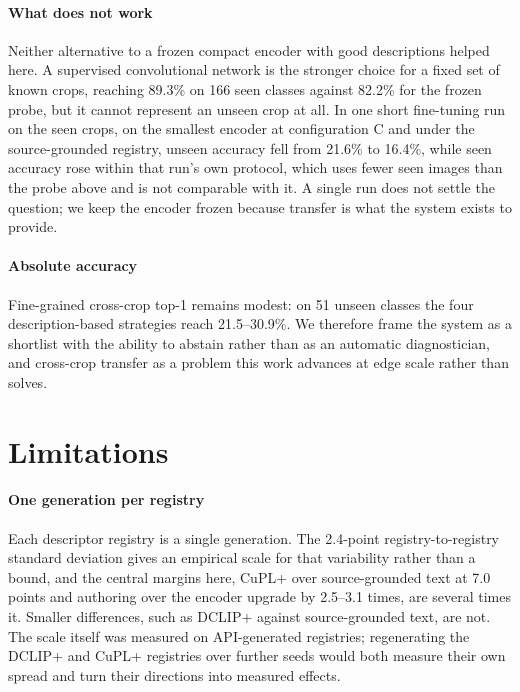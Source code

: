 \documentclass[a4paper,fleqn]{cas-dc}
\begin{document}
\paragraph{What does not work} Neither alternative to a frozen compact encoder with good
descriptions helped here. A supervised convolutional network is the stronger choice for a fixed set
of known crops, reaching 89.3\% on 166 seen classes against 82.2\% for the frozen probe, but it
cannot represent an unseen crop at all. In one short fine-tuning run on the seen crops, on the
smallest encoder at configuration C and under the source-grounded registry, unseen accuracy fell
from 21.6\% to 16.4\%, while seen accuracy rose within that run's own protocol, which uses fewer
seen images than the probe above and is not comparable with it. A single run does not settle the
question; we keep the encoder frozen because transfer is what the system exists to provide.

\paragraph{Absolute accuracy} Fine-grained cross-crop top-1 remains modest: on 51 unseen classes the four
description-based strategies reach 21.5--30.9\%. We therefore frame the system as a shortlist with the ability to abstain rather than as an
automatic diagnostician, and cross-crop transfer as a problem this work advances at edge scale rather
than solves.

\section{Limitations}
\label{sec:limits}

\paragraph{One generation per registry} Each descriptor registry is a single generation. The
2.4-point registry-to-registry standard deviation gives an empirical scale for that variability
rather than a bound, and the central margins here, CuPL+ over source-grounded text at 7.0 points and
authoring over the encoder upgrade by 2.5--3.1 times, are several times it. Smaller differences, such
as DCLIP+ against source-grounded text, are not. The scale itself was measured on API-generated
registries; regenerating the DCLIP+ and CuPL+ registries over further seeds would both measure their
own spread and turn their directions into measured effects.
\end{document}

